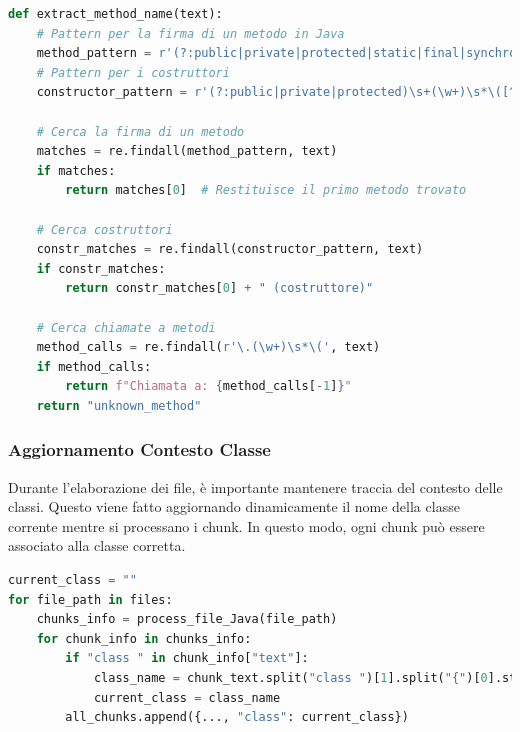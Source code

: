 \documentclass[12pt,a4paper,openright,twoside]{book}
\begin{document}
\begin{lstlisting}[language=Python, caption={Estrazione contesto dai chunk}]
    def extract_method_name(text):
    # Pattern per la firma di un metodo in Java
    method_pattern = r'(?:public|private|protected|static|final|synchronized|abstract|native)\s+[\w<>\[\]]+\s+(\w+)\s*\([^)]*\)'
    # Pattern per i costruttori
    constructor_pattern = r'(?:public|private|protected)\s+(\w+)\s*\([^)]*\)'
    
    # Cerca la firma di un metodo
    matches = re.findall(method_pattern, text)
    if matches:
        return matches[0]  # Restituisce il primo metodo trovato
    
    # Cerca costruttori
    constr_matches = re.findall(constructor_pattern, text)
    if constr_matches:
        return constr_matches[0] + " (costruttore)"
    
    # Cerca chiamate a metodi
    method_calls = re.findall(r'\.(\w+)\s*\(', text)
    if method_calls:
        return f"Chiamata a: {method_calls[-1]}"
    return "unknown_method"
\end{lstlisting}

\subsubsection{Aggiornamento Contesto Classe}
Durante l'elaborazione dei file, è importante mantenere traccia del contesto delle classi.
Questo viene fatto aggiornando dinamicamente il nome della classe corrente mentre si processano i chunk.
In questo modo, ogni chunk può essere associato alla classe corretta.

\begin{lstlisting}[language=Python, caption={Aggiornamento contesto classe}]
current_class = ""
for file_path in files:
    chunks_info = process_file_Java(file_path)
    for chunk_info in chunks_info:
        if "class " in chunk_info["text"]:
            class_name = chunk_text.split("class ")[1].split("{")[0].strip()
            current_class = class_name
        all_chunks.append({..., "class": current_class})
\end{lstlisting}
\end{document}
